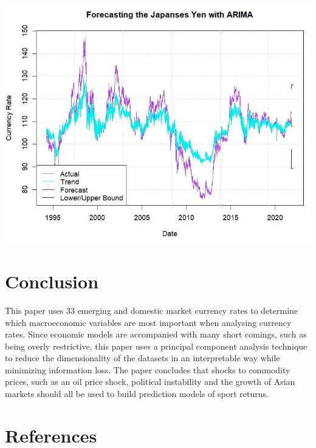\documentclass[11pt,preprint, authoryear]{elsarticle}
\let\origfigure\figure
\let\endorigfigure\endfigure
\renewenvironment{figure}[1][2] {
    \expandafter\origfigure\expandafter[H]
} {
    \endorigfigure
}
\numberwithin{equation}{section}
\numberwithin{figure}{section}
\numberwithin{table}{section}
\begin{document}
\begin{figure}
\centering
\includegraphics[scale=0.5]{fore3.jpg}
\caption{Forecasing Results (2)}
\label{for2}
\end{figure}

\newpage

\hypertarget{conclusion}{%
\section{Conclusion}\label{conclusion}}

This paper uses 33 emerging and domestic market currency rates to
determine which macroeconomic variables are most important when
analysing currency rates. Since economic models are accompanied with
many short comings, such as being overly restrictive, this paper uses a
principal component analysis technique to reduce the dimensionality of
the datasets in an interpretable way while minimizing information loss.
The paper concludes that shocks to commodity prices, such as an oil
price shock, political instability and the growth of Asian markets
should all be used to build prediction models of sport returns.

\newpage

\hypertarget{references}{%
\section*{References}\label{references}}
\end{document}
